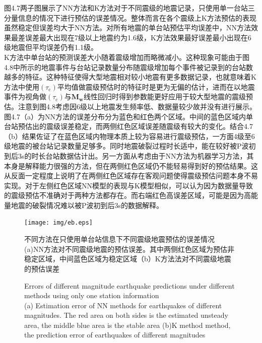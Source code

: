 \indent 图4.7两子图展示了NN方法和K方法对于不同震级的地震记录，只使用单一台站三分量信息的情况下进行预估的误差情况。整体而言在各个震级上K方法预估的表现虽然稳定但误差均大于NN方法。对所有地震的单台站预估平均误差中，NN方法效果最差误差最大出现在7级以上地震约为1.6级，K方法效果最好误差最小出现在6级地震但平均误差仍有1.1级。\\
\indent K方法中单台站的预测误差大小随着震级增加而略微减小。这种现象可能由于图4.8中所示的地震事件与台站记录数量分布随震级增加每个事件被记录到的台站数越多的特征。这种特征使得大型地震相对较小地震有更多数据记录，也就意味着K方法中使用$\left(\tau_{\mathrm{c}}\right)$平均值做震级预估时的特征时是更为无偏的估计，进而在以地震事件为视角做$\left(\tau_{\mathrm{c}}\right)$与$\mathbf{M}_{\mathbf{w}}$线性回归时得到参数能更好应用于较大型地震的震级预估。注意到图4.8考虑因6级以上地震发生频率低、数据量较少故并没有进行展示。\\
\indent 图4.7（a）为NN方法的误差分布分为蓝色和红色两个区域。中间的蓝色区域内单台站预估出的震级误差稳定，而两侧红色区域误差随震级有较大的变化。结合4.7（b）结果佐证了在蓝色区域内物理本质上较为容易进行震级预估，一方面4级至6级地震的被台站记录数量足够多。同时地震破裂过程时长适中，能在较好被P波初到后3s的时长台站数据估计出。另一方面从考虑由于NN方法为机器学习方法，其本身是解释能力很强的方法，但在两侧红色区域仍不能轻易得到好的预估结果。这从反面一定程度上说明了在两侧红色区域存在客观问题使得震级预估问题本身不易实现。对于左侧红色区域NN模型的表现与K模型相似，可以认为因为数据量导致的震级预估不准确对于两种方法都存在。而右端红色高误差区域，可能是因为高能量地震的破裂情况难以被P波初到后3s的数据解释。\\
\begin{figure}[!h] 
\centering 
\texttt{[image: img/eb.eps]} 
\renewcommand{\figurename}{图} 
\caption{不同方法在只使用单台站信息下不同震级地震预估的误差情况\\
(a)NN方法对不同震级地震的预估误差。其中两侧红色区域为预估非稳定区域，中间蓝色区域为稳定区域（b）K方法法对不同震级地震的预估误差} 
\addtocounter{figure}{-1} \vspace{-5pt} 
\renewcommand{\figurename}{Fig} 
\caption{Errors of different magnitude earthquake predictions under different methods using only one station information\\
(a) Estimation error of NN methods for earthquakes of different magnitudes. The red area on both sides is the estimated unsteady area, the middle blue area is the stable area (b)K method method, the prediction error of earthquakes of different magnitudes} 
\renewcommand{\figurename}{图} 
\label{fig:network-device-influence.png} 
\end{figure}
